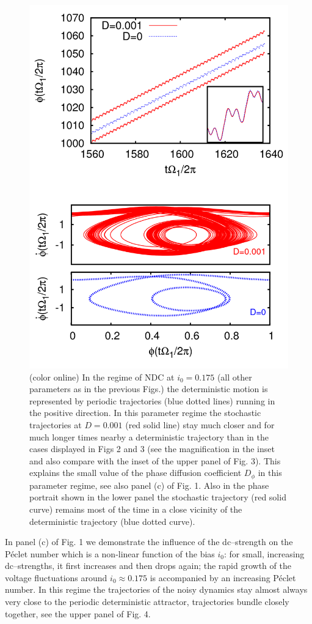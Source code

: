 \documentclass{physeauth}
\begin{document}
\begin{figure}
\includegraphics[width=1\linewidth]{fig4} 
\caption{(color online)  
In the regime of NDC at $i_0=0.175$ (all other parameters as in the
previous Figs.) the deterministic motion is represented by 
periodic trajectories (blue dotted lines) running in the positive
direction. 
In this parameter regime the stochastic trajectories at $D=0.001$ (red
solid line) stay much closer 
and for much longer times nearby a deterministic trajectory than in the
cases displayed in Figs 2 and 3 (see the magnification in the inset and 
also compare with the
inset of the upper panel of Fig. 3). This
explains the small value of the phase diffusion coefficient $D_{\phi}$
in this parameter regime, see also panel (c) of Fig. 1. Also in the phase
portrait shown in the lower panel the stochastic
trajectory (red solid curve)  remains most of the time in a close
vicinity of the deterministic trajectory (blue dotted curve).  
}
\label{fig4}
\end{figure}
In panel (c) of Fig. 1 we demonstrate the influence of the dc--strength 
on the P\'eclet number which  is a non-linear function of the
bias $i_0$:   for small, increasing dc--strengths,
it first increases and then 
drops again; the rapid growth of the voltage fluctuations around
$i_{0} \approx 0.175$ is accompanied
by an increasing  P\'eclet number.  In this regime the
trajectories of the noisy dynamics stay almost always very close to the
periodic deterministic attractor, trajectories bundle closely together, 
see the upper panel of Fig. 4.
\end{document}
